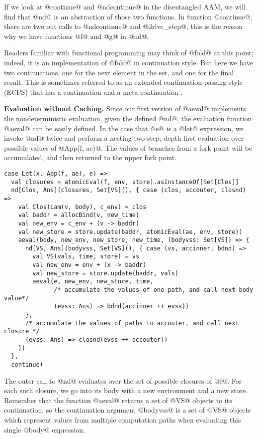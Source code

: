\documentclass[acmsmall]{acmart}\settopmatter{}
\begin{document}
If we look at @continue@ and @ndcontinue@ in the disentangled AAM, we will find
that @nd@ is an abstraction of those two functions. In function @continue@,
there are two out calls to @ndcontinue@ and @drive_step@, this is the reason why
we have functions @f@ and @g@ in @nd@.

Readers familiar with functional programming may think of @fold@ at this point; indeed,
it is an implementation of @fold@ in continuation style. But here we have two
continuations, one for the next element in the set, and one for the final result.
This is sometimes referred to as an extended continuation-passing style (ECPS)
that has a continuation and a meta-continuation \cite{Danvy:1990:AC:91556.91622}.

\textbf{Evaluation without Caching.}
Since our first version of @aeval@ implements the nondeterministic
evaluation, given the defined @nd@, the evaluation function @aeval@ can be easily
defined. In the case that @e@ is a @let@ expression,
we invoke @nd@ twice and perform a nesting two-step, depth-first evaluation
over possible values of @App(f, ae)@.
The values of branches from a fork point will be accumulated, and then
returned to the upper fork point.

\begin{lstlisting}
case Let(x, App(f, ae), e) =>
  val closures = atomicEval(f, env, store).asInstanceOf[Set[Clos]]
  nd[Clos, Ans](closures, Set[VS](), { case (clos, accouter, closnd) =>
    val Clos(Lam(v, body), c_env) = clos
    val baddr = allocBind(v, new_time)
    val new_env = c_env + (v -> baddr)
    val new_store = store.update(baddr, atomicEval(ae, env, store))
    aeval(body, new_env, new_store, new_time, (bodyvss: Set[VS]) => {
      nd[VS, Ans](bodyvss, Set[VS](), { case (vs, accinner, bdnd) =>
        val VS(vals, time, store) = vs
        val new_env = env + (x -> baddr)
        val new_store = store.update(baddr, vals)
        aeval(e, new_env, new_store, time,
              /* accumulate the values of one path, and call next body value*/
              (evss: Ans) => bdnd(accinner ++ evss))
      },
      /* accumulate the values of paths to accouter, and call next closure */
      (evss: Ans) => closnd(evss ++ accouter))
    })
  },
  continue)
\end{lstlisting}

The outer call to @nd@ evaluates over the set of possible closures of
@f@. For each such closure, we go into its body with a new environment and a new store.
Remember that the function @aeval@ returns a set of @VS@ objects to its continuation,
so the continuation argument @bodyvss@ is a set of @VS@ objects which represent values
from multiple computation paths when evaluating this single @body@ expression.
\end{document}
